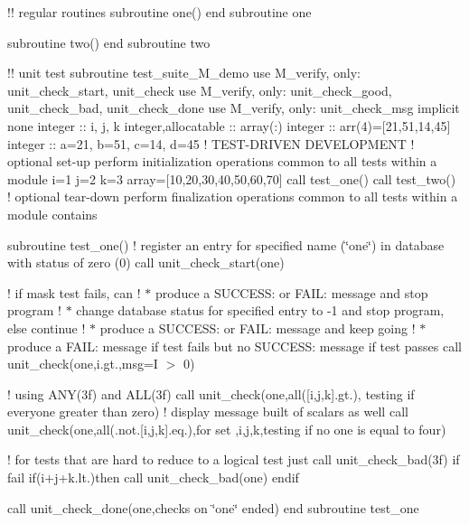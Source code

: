 !! regular routines subroutine one() end subroutine one

subroutine two() end subroutine two

!! unit test subroutine test\+\_\+suite\+\_\+\+M\+\_\+demo use M\+\_\+verify, only\+: unit\+\_\+check\+\_\+start, unit\+\_\+check use M\+\_\+verify, only\+: unit\+\_\+check\+\_\+good, unit\+\_\+check\+\_\+bad, unit\+\_\+check\+\_\+done use M\+\_\+verify, only\+: unit\+\_\+check\+\_\+msg implicit none integer \+:\+: i, j, k integer,allocatable \+:\+: array(\+:) integer \+:\+: arr(4)=\mbox{[}21,51,14,45\mbox{]} integer \+:\+: a=21, b=51, c=14, d=45 ! T\+E\+S\+T-\/\+D\+R\+I\+V\+EN D\+E\+V\+E\+L\+O\+P\+M\+E\+NT ! optional set-\/up perform initialization operations common to all tests within a module i=1 j=2 k=3 array=\mbox{[}10,20,30,40,50,60,70\mbox{]} call test\+\_\+one() call test\+\_\+two() ! optional tear-\/down perform finalization operations common to all tests within a module contains

subroutine test\+\_\+one() ! register an entry for specified name (\char`\"{}one\char`\"{}) in database with status of zero (0) call unit\+\_\+check\+\_\+start(\textquotesingle{}one\textquotesingle{})

! if mask test fails, can ! $\ast$ produce a S\+U\+C\+C\+E\+SS\+: or F\+A\+IL\+: message and stop program ! $\ast$ change database status for specified entry to -\/1 and stop program, else continue ! $\ast$ produce a S\+U\+C\+C\+E\+SS\+: or F\+A\+IL\+: message and keep going ! $\ast$ produce a F\+A\+IL\+: message if test fails but no S\+U\+C\+C\+E\+SS\+: message if test passes call unit\+\_\+check(\textquotesingle{}one\textquotesingle{},i.\+gt.,msg=\textquotesingle{}I $>$ 0\textquotesingle{})

! using A\+N\+Y(3f) and A\+L\+L(3f) call unit\+\_\+check(\textquotesingle{}one\textquotesingle{},all(\mbox{[}i,j,k\mbox{]}.gt.), \textquotesingle{}testing if everyone greater than zero\textquotesingle{}) ! display message built of scalars as well call unit\+\_\+check(\textquotesingle{}one\textquotesingle{},all(.not.\mbox{[}i,j,k\mbox{]}.eq.),\textquotesingle{}for set \textquotesingle{},i,j,k,\textquotesingle{}testing if no one is equal to four\textquotesingle{})

! for tests that are hard to reduce to a logical test just call unit\+\_\+check\+\_\+bad(3f) if fail if(i+j+k.lt.)then call unit\+\_\+check\+\_\+bad(\textquotesingle{}one\textquotesingle{}) endif

call unit\+\_\+check\+\_\+done(\textquotesingle{}one\textquotesingle{},\textquotesingle{}checks on \char`\"{}one\char`\"{} ended\textquotesingle{}) end subroutine test\+\_\+one

